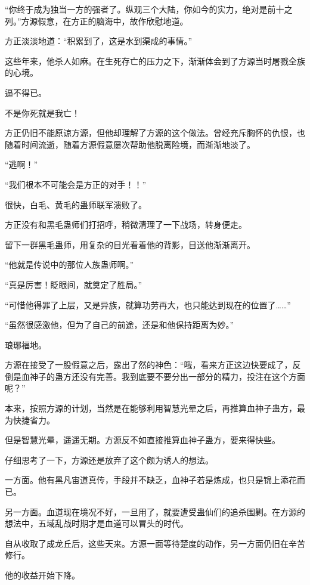 
\begin{this_body}

“你终于成为独当一方的强者了。纵观三个大陆，你如今的实力，绝对是前十之列。”方源假意，在方正的脑海中，故作欣慰地道。

方正淡淡地道：“积累到了，这是水到渠成的事情。”

这些年来，他杀人如麻。在生死存亡的压力之下，渐渐体会到了方源当时屠戮全族的心境。

逼不得已。

不是你死就是我亡！

方正仍旧不能原谅方源，但他却理解了方源的这个做法。曾经充斥胸怀的仇恨，也随着时间流逝，随着方源假意屡次帮助他脱离险境，而渐渐地淡了。

“逃啊！”

“我们根本不可能会是方正的对手！！”

很快，白毛、黄毛的蛊师联军溃败了。

方正没有和黑毛蛊师们打招呼，稍微清理了一下战场，转身便走。

留下一群黑毛蛊师，用复杂的目光看着他的背影，目送他渐渐离开。

“他就是传说中的那位人族蛊师啊。”

“真是厉害！眨眼间，就奠定了胜局。”

“可惜他得罪了上层，又是异族，就算功劳再大，也只能达到现在的位置了……”

“虽然很感激他，但为了自己的前途，还是和他保持距离为妙。”

琅琊福地。

方源在接受了一股假意之后，露出了然的神色：“哦，看来方正这边快要成了，反倒是血神子的蛊方还没有完善。我到底要不要分出一部分的精力，投注在这个方面呢？”

本来，按照方源的计划，当然是在能够利用智慧光晕之后，再推算血神子蛊方，最为快捷省力。

但是智慧光晕，遥遥无期。方源反不如直接推算血神子蛊方，要来得快些。

仔细思考了一下，方源还是放弃了这个颇为诱人的想法。

一方面。他有黑凡宙道真传，手段并不缺乏，血神子若是炼成，也只是锦上添花而已。

另一方面。血道现在境况不好，一旦用了，就要遭受蛊仙们的追杀围剿。在方源的想法中，五域乱战时期才是血道可以冒头的时代。

自从收取了成龙丘后，这些天来。方源一面等待楚度的动作，另一方面仍旧在辛苦修行。

他的收益开始下降。


\end{this_body}
